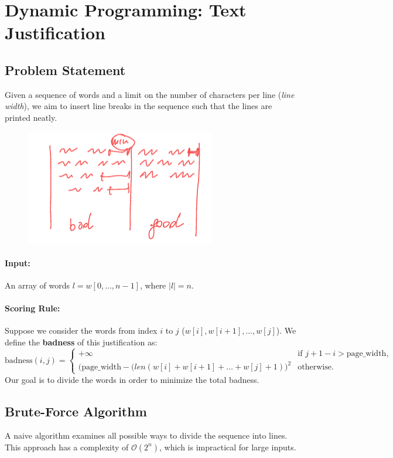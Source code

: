 \section{Dynamic Programming: Text Justification}

\subsection{Problem Statement}
Given a sequence of words and a limit on the number of characters per line (\textit{line width}), we aim to insert line breaks in the sequence such that the lines are printed neatly.
\begin{figure}[h!]
    \centering
    \includegraphics[width=0.75\linewidth]{immagini//capitolo 13/13_8.png}
    \label{fig:enter-label}
\end{figure}
\paragraph{Input:} An array of words $l = w[0, \ldots, n-1]$, where $|l| = n$.

\paragraph{Scoring Rule:} 
Suppose we consider the words from index $i$ to $j$ ($w[i], w[i+1], \ldots, w[j]$). We define the \textbf{badness} of this justification as:
\[
\text{badness}(i, j) =
\begin{cases}
+\infty & \text{if } j+1-i > \text{page\_width}, \\
\big(\text{page\_width} - (len(w[i]+ w[i+1]+\ldots+w[j] + 1)\big)^2 & \text{otherwise.}
\end{cases}
\]
Our goal is to divide the words in order to minimize the total badness.

\subsection{Brute-Force Algorithm}
A naive algorithm examines all possible ways to divide the sequence into lines. This approach has a complexity of $\mathcal{O}(2^n)$, which is impractical for large inputs.

